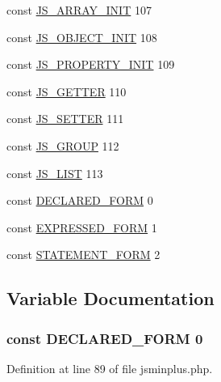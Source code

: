 \begin{DoxyCompactItemize}
\item 
const \hyperlink{jsminplus_8php_ae9e79378a160fc31c3038963ccc15094}{J\+S\+\_\+\+A\+R\+R\+A\+Y\+\_\+\+I\+N\+I\+T} 107
\item 
const \hyperlink{jsminplus_8php_a9da96c8d85273bec327c30db9c9f4c30}{J\+S\+\_\+\+O\+B\+J\+E\+C\+T\+\_\+\+I\+N\+I\+T} 108
\item 
const \hyperlink{jsminplus_8php_a87491006a69d6385b715ad37bc82a818}{J\+S\+\_\+\+P\+R\+O\+P\+E\+R\+T\+Y\+\_\+\+I\+N\+I\+T} 109
\item 
const \hyperlink{jsminplus_8php_aa32db2c1394005134f445d8e2f6365d1}{J\+S\+\_\+\+G\+E\+T\+T\+E\+R} 110
\item 
const \hyperlink{jsminplus_8php_af337e150e40d21926daff6ce82cd4693}{J\+S\+\_\+\+S\+E\+T\+T\+E\+R} 111
\item 
const \hyperlink{jsminplus_8php_a3eafcc36ecbc2283eecf403964522919}{J\+S\+\_\+\+G\+R\+O\+U\+P} 112
\item 
const \hyperlink{jsminplus_8php_a9a02cc4ea8016c6ab09fd42512d6b43c}{J\+S\+\_\+\+L\+I\+S\+T} 113
\item 
const \hyperlink{jsminplus_8php_a2fadccae9050fa075c478cb812707d58}{D\+E\+C\+L\+A\+R\+E\+D\+\_\+\+F\+O\+R\+M} 0
\item 
const \hyperlink{jsminplus_8php_ae736a7666359711bf526f2444cca8983}{E\+X\+P\+R\+E\+S\+S\+E\+D\+\_\+\+F\+O\+R\+M} 1
\item 
const \hyperlink{jsminplus_8php_a4e43aadaa46d5f2314079520634f70a1}{S\+T\+A\+T\+E\+M\+E\+N\+T\+\_\+\+F\+O\+R\+M} 2
\end{DoxyCompactItemize}


\subsection{Variable Documentation}
\hypertarget{jsminplus_8php_a2fadccae9050fa075c478cb812707d58}{
\subsubsection[{D\+E\+C\+L\+A\+R\+E\+D\+\_\+\+F\+O\+R\+M}]{\setlength{\rightskip}{0pt plus 5cm}const D\+E\+C\+L\+A\+R\+E\+D\+\_\+\+F\+O\+R\+M 0}}\label{jsminplus_8php_a2fadccae9050fa075c478cb812707d58}


Definition at line 89 of file jsminplus.\+php.

